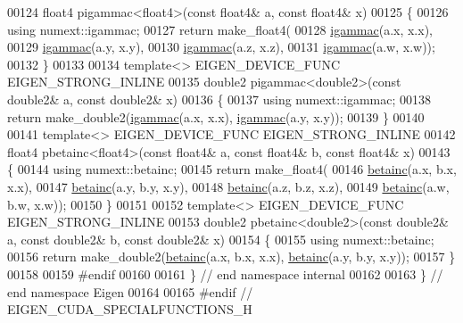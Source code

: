 \begin{DoxyCode}
00124 float4 pigammac<float4>(\textcolor{keyword}{const} float4& a, \textcolor{keyword}{const} float4& x)
00125 \{
00126   \textcolor{keyword}{using} numext::igammac;
00127   \textcolor{keywordflow}{return} make\_float4(
00128       \hyperlink{namespace_eigen_a1abaa2ff8c7b1871eaf026a47c6bbf3b}{igammac}(a.x, x.x),
00129       \hyperlink{namespace_eigen_a1abaa2ff8c7b1871eaf026a47c6bbf3b}{igammac}(a.y, x.y),
00130       \hyperlink{namespace_eigen_a1abaa2ff8c7b1871eaf026a47c6bbf3b}{igammac}(a.z, x.z),
00131       \hyperlink{namespace_eigen_a1abaa2ff8c7b1871eaf026a47c6bbf3b}{igammac}(a.w, x.w));
00132 \}
00133 
00134 \textcolor{keyword}{template}<> EIGEN\_DEVICE\_FUNC EIGEN\_STRONG\_INLINE
00135 double2 pigammac<double2>(\textcolor{keyword}{const} double2& a, \textcolor{keyword}{const} double2& x)
00136 \{
00137   \textcolor{keyword}{using} numext::igammac;
00138   \textcolor{keywordflow}{return} make\_double2(\hyperlink{namespace_eigen_a1abaa2ff8c7b1871eaf026a47c6bbf3b}{igammac}(a.x, x.x), \hyperlink{namespace_eigen_a1abaa2ff8c7b1871eaf026a47c6bbf3b}{igammac}(a.y, x.y));
00139 \}
00140 
00141 \textcolor{keyword}{template}<> EIGEN\_DEVICE\_FUNC EIGEN\_STRONG\_INLINE
00142 float4 pbetainc<float4>(\textcolor{keyword}{const} float4& a, \textcolor{keyword}{const} float4& b, \textcolor{keyword}{const} float4& x)
00143 \{
00144   \textcolor{keyword}{using} numext::betainc;
00145   \textcolor{keywordflow}{return} make\_float4(
00146       \hyperlink{namespace_eigen_a726eae91d4e91d8e25cbe55fffa6a92f}{betainc}(a.x, b.x, x.x),
00147       \hyperlink{namespace_eigen_a726eae91d4e91d8e25cbe55fffa6a92f}{betainc}(a.y, b.y, x.y),
00148       \hyperlink{namespace_eigen_a726eae91d4e91d8e25cbe55fffa6a92f}{betainc}(a.z, b.z, x.z),
00149       \hyperlink{namespace_eigen_a726eae91d4e91d8e25cbe55fffa6a92f}{betainc}(a.w, b.w, x.w));
00150 \}
00151 
00152 \textcolor{keyword}{template}<> EIGEN\_DEVICE\_FUNC EIGEN\_STRONG\_INLINE
00153 double2 pbetainc<double2>(\textcolor{keyword}{const} double2& a, \textcolor{keyword}{const} double2& b, \textcolor{keyword}{const} double2& x)
00154 \{
00155   \textcolor{keyword}{using} numext::betainc;
00156   \textcolor{keywordflow}{return} make\_double2(\hyperlink{namespace_eigen_a726eae91d4e91d8e25cbe55fffa6a92f}{betainc}(a.x, b.x, x.x), \hyperlink{namespace_eigen_a726eae91d4e91d8e25cbe55fffa6a92f}{betainc}(a.y, b.y, x.y));
00157 \}
00158 
00159 \textcolor{preprocessor}{#endif}
00160 
00161 \} \textcolor{comment}{// end namespace internal}
00162 
00163 \} \textcolor{comment}{// end namespace Eigen}
00164 
00165 \textcolor{preprocessor}{#endif // EIGEN\_CUDA\_SPECIALFUNCTIONS\_H}
\end{DoxyCode}
